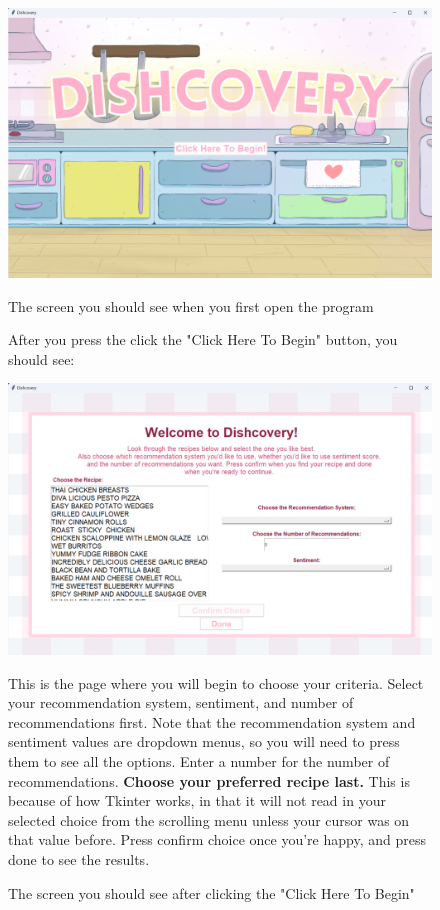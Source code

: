 \documentclass[fontsize=11pt]{article}
\begin{document}
\begin{figure}
    \centering
    \includegraphics[width=0.8\linewidth]{startscreen.png}
    \caption{The screen you should see when you first open the program}
    \label{fig:enter-label}
    \begin{flushleft} 
    After you press the click the "Click Here To Begin" button, you should see: \end{flushleft}
    
    \includegraphics[width=0.8\linewidth]{image.png}
    \caption{The screen you should see after clicking the "Click Here To Begin"}
    \label{fig:enter-label}
    \begin{flushleft} 
    This is the page where you will begin to choose your criteria. Select your recommendation system, sentiment, and number of recommendations first. Note that the recommendation system and sentiment values are dropdown menus, so you will need to press them to see all the options. Enter a number for the number of recommendations. \textbf{Choose your preferred recipe last.} This is because of how Tkinter works, in that it will not read in your selected choice from the scrolling menu unless your cursor was on that value before. Press confirm choice once you're happy, and press done to see the results. \end{flushleft}

    
\end{figure}
\end{document}
